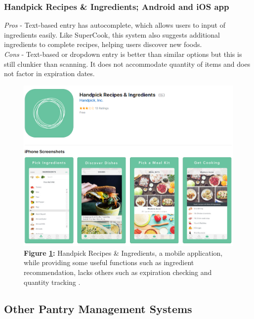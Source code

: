 \documentclass{sigchi}
\begin{document}
	\subsubsection{\textbf{Handpick Recipes \& Ingredients}; Android and iOS app}
		\textit{Pros} - Text-based entry has autocomplete, which allows users to input of ingredients easily. Like SuperCook, this system also suggests additional ingredients to complete recipes, helping users discover new foods.\\
		\textit{Cons} - Text-based or dropdown entry is better than similar options but this is still clunkier than scanning. It does not accommodate quantity of items and does not factor in expiration dates.
		\begin{figure}[htb!]
		\centering
			\includegraphics[width=0.8\columnwidth]{hpri.png}\\
			\textbf{Figure \ref{fig:hpri}:} Handpick Recipes \& Ingredients, a mobile application, while providing some useful functions such as ingredient recommendation, lacks others such as expiration checking and quantity tracking \cite{handpick}.
			\label{fig:hpri}
		\end{figure}

\subsection{Other Pantry Management Systems}\label{ssec:expirations}
\end{document}

